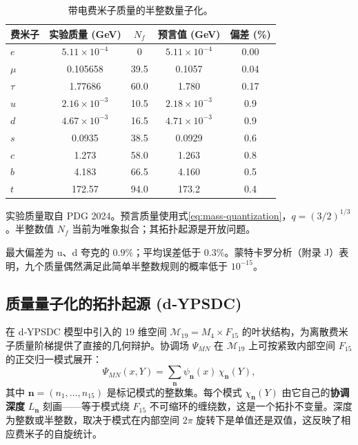 \documentclass[12pt,a4paper]{article}
\begin{document}
	\begin{table}[H]
		\centering
		\caption{带电费米子质量的半整数量子化。}
		\label{tab:fermions}
		\begin{tabular}{l c c c c}
			\toprule
			费米子 & 实验质量 (GeV) & \(N_f\) & 预言值 (GeV) & 偏差 (\%) \\
			\midrule
			\(e\)   & \(5.11\times10^{-4}\) & 0      & \(5.11\times10^{-4}\) & 0.00 \\
			\(\mu\)  & 0.105658             & 39.5   & 0.1057               & 0.04 \\
			\(\tau\) & 1.77686              & 60.0   & 1.780                & 0.17 \\
			\(u\)   & \(2.16\times10^{-3}\) & 10.5   & \(2.18\times10^{-3}\) & 0.9 \\
			\(d\)   & \(4.67\times10^{-3}\) & 16.5   & \(4.71\times10^{-3}\) & 0.9 \\
			\(s\)   & 0.0935               & 38.5   & 0.0929               & 0.6 \\
			\(c\)   & 1.273                & 58.0   & 1.263                & 0.8 \\
			\(b\)   & 4.183                & 66.5   & 4.160                & 0.5 \\
			\(t\)   & 172.57               & 94.0   & 173.2                & 0.4 \\
			\bottomrule
		\end{tabular}
		\par\smallskip
		\footnotesize
		实验质量取自 PDG 2024。预言质量使用式\eqref{eq:mass-quantization}，\(q = (3/2)^{1/3}\)。半整数值 \(N_f\) 当前为唯象拟合；其拓扑起源是开放问题。
	\end{table}
	
	最大偏差为 u、d 夸克的 \(0.9\%\)；平均误差低于 \(0.3\%\)。蒙特卡罗分析（附录 J）表明，九个质量偶然满足此简单半整数规则的概率低于 \(10^{-15}\)。
	
	\subsection{质量量子化的拓扑起源 (d‑YPSDC)}
	\label{subsec:topo-mass}
	\label{sec:d-ypsdc-model}
	
	在 d‑YPSDC 模型中引入的 19 维空间 \(\mathcal{M}_{19}=M_4\times F_{15}\) 的叶状结构，为离散费米子质量阶梯提供了直接的几何辩护。协调场 \(\Psi_{MN}\) 在 \(\mathcal{M}_{19}\) 上可按紧致内部空间 \(F_{15}\) 的正交归一模式展开：
	\begin{equation}
		\Psi_{MN}(x,Y) = \sum_{\mathbf{n}} \psi_{\mathbf{n}}(x)\, \chi_{\mathbf{n}}(Y),
		\label{eq:mode-exp}
	\end{equation}
	其中 \(\mathbf{n}=(n_1,\dots,n_{15})\) 是标记模式的整数集。每个模式 \(\chi_{\mathbf{n}}(Y)\) 由它自己的\textbf{协调深度} \(L_{\mathbf{n}}\) 刻画——等于模式绕 \(F_{15}\) 不可缩环的缠绕数，这是一个拓扑不变量。深度为整数或半整数，取决于模式在内部空间 \(2\pi\) 旋转下是单值还是双值，这反映了相应费米子的自旋统计。
	
\end{document}
